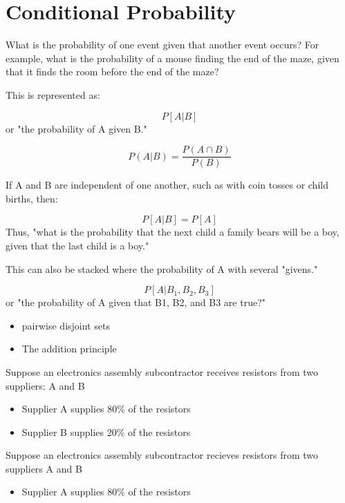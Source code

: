 \documentclass[12pt]{report}
\begin{document}
{{\section{Conditional Probability}
What is the probability of one event given that another event occurs? For example, what is the probability of a mouse finding the end of the maze, given that it finds the room before the end of the maze?

This is represented as:


\[P[A | B]\]
or "the probability of A given B."

\[P(A | B) = \frac{P(A\cap B)}{P(B)}\]

If A and B are independent of one another, such as with coin tosses or child births, then:


\[P[A | B] = P[ A ]\]
Thus, "what is the probability that the next child a family bears will be a boy, given that the last child is a boy."

This can also be stacked where the probability of A with several "givens."


\[P[A | B_1, B_2, B_3 ]\]
or "the probability of A given that B1, B2, and B3 are true?"



\begin{itemize}
	\item pairwise disjoint sets
	\item The addition principle
\end{itemize}



\Large
Suppose an electronics assembly subcontractor receives resistors from two suppliers: A and B

\begin{itemize}
	\item Supplier A supplies 80\% of the resistors
	\vspace{2cm}
	\item Supplier B supplies 20\% of the resistors
	\vspace{2cm}
\end{itemize}


\Large
Suppose an electronics assembly subcontractor recieves resistors from two suppliers A and B

\begin{itemize}
	\item Supplier A supplies 80\% of the resistors
	{
		\Large
		
}
\end{itemize}}}
\end{document}
